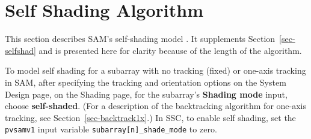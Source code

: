 \documentclass[12pt,letterpaper]{article}
\begin{document}
\chapter{Self Shading Algorithm}\label{sec-selfshadalg}

This section describes SAM's self-shading model \citep{deline2013a}. It supplements Section~\ref{sec-selfshad} and is presented here for clarity because of the length of the algorithm.

To model self shading for a subarray with no tracking (fixed) or one-axis tracking in SAM, after specifying the tracking and orientation options on the System Design page, on the Shading page, for the subarray's \textbf{Shading mode} input, choose \textbf{self-shaded}. (For a description of the backtracking algorithm for one-axis tracking, see Section~\ref{sec-backtrack1x}.) In SSC, to enable self shading, set the \texttt{pvsamv1} input variable \texttt{subarray[n]\_shade\_mode} to zero.
\end{document}
